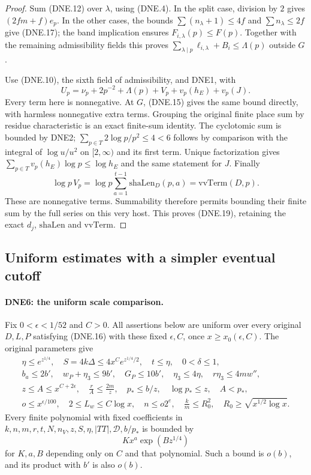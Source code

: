 \documentclass[11pt,a4paper]{article}
\numberwithin{equation}{section}
\theoremstyle{remark}\newtheorem{remark}[theorem]{Remark}
\begin{document}
\begin{proof}
Sum (DNE.12) over $\lambda$, using (DNE.4).
In the split case, division by $2$ gives $(2fm+f)e_p$.
In the other cases, the bounds $\sum(n_\lambda+1)\le4f$
and $\sum n_\lambda\le2f$ give (DNE.17); the band implication
ensures $F_{i,\lambda}(p)\le F(p)$.  Together with the remaining
admissibility fields this proves
$\sum_{\lambda\mid p}\ell_{i,\lambda}+B_i\le\Lambda(p)$
outside $G$.

Use (DNE.10), the sixth field of admissibility, and DNE1, with
\[
 U_p=\nu_p+2p^{-2}+\Lambda(p)+V_p+v_p(h_E)+v_p(J).
\]
Every term here is nonnegative.  At $G$, (DNE.15) gives the same
bound directly, with harmless nonnegative extra terms.  Grouping
the original finite place sum by residue characteristic is an exact
finite-sum identity.  The cyclotomic sum is bounded by DNE2;
$\sum_{p\in T}2\log p/p^2\le4<6$ follows by comparison with the
integral of $\log u/u^2$ on $[2,\infty)$ and its first term.
Unique factorization gives
$\sum_{p\in T}v_p(h_E)\log p\le\log h_E$ and the same statement
for $J$.  Finally
\[
 \log p\,V_p=
  \log p\sum_{a=1}^{t-1}\mathrm{shaLen}_D(p,a)
       =\mathrm{vvTerm}(D,p).
\]
These are nonnegative terms.  Summability therefore permits bounding
their finite sum by the full series on this very host.  This proves
(DNE.19), retaining the exact $d_j$, $\mathrm{shaLen}$ and $\mathrm{vvTerm}$.
\end{proof}

\subsection{Uniform estimates with a simpler eventual cutoff}

\paragraph{DNE6: the uniform scale comparison.}
\label{claim:DNE6}
Fix $0<\epsilon<1/52$ and $C>0$.  All assertions below are uniform
over every original $D,L,P$ satisfying (DNE.16) with these fixed
$\epsilon,C$, once $x\ge x_0(\epsilon,C)$.
The original parameters give
\[
\begin{gathered}
 \eta\le e^{z^{1/4}},\quad S=4k\Delta\le4x^C e^{z^{1/4}/2},
 \quad t\le\eta,\quad 0<\delta\le1,\\
 b_a\le2b',\quad w_P+\eta_3\le9b',\quad G_P\le10b',\quad
 \eta_3\le4\eta,\quad r\eta_3\le4m w'',\\
 z\le A\le x^{C+2\epsilon},\quad
 \frac rA\le\frac{2m}{z},\quad
 p_*\le b/z,\quad \log p_*\le z,\quad A<p_*,\\
 o\le x^{\epsilon/100},\quad 2\le L_w\le C\log x,
 \quad n\le o2^e,\quad \frac km\le R_0^2,
 \quad R_0\ge\sqrt{x^{1/2}\log x}.
\end{gathered}                                                    \tag{DNE.20}
\]
Every finite polynomial with fixed coefficients in
$k,n,m,r,t,N,n_V,z,S,\eta,|TT|,\mathcal D,b/p_*$ is bounded by
\[
             Kx^a\exp(Bz^{1/4})                                \tag{DNE.21}
\]
for $K,a,B$ depending only on $C$ and that polynomial.  Such a
bound is $o(b)$, and its product with $b'$ is also $o(b)$.
\end{document}
